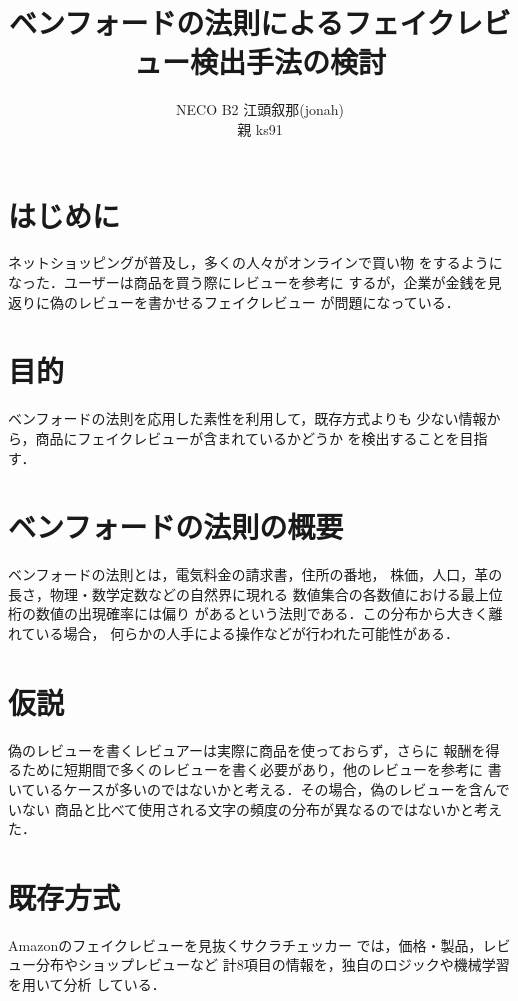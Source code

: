 \documentclass[a4paper, twocolumn]{jsarticle}
\begin{document}
\title{ベンフォードの法則によるフェイクレビュー検出手法の検討}
\author{
  NECO B2 江頭叙那(jonah)
  \\ 親 ks91 
}
\maketitle

\section{はじめに}

ネットショッピングが普及し，多くの人々がオンラインで買い物
をするようになった．ユーザーは商品を買う際にレビューを参考に
するが，企業が金銭を見返りに偽のレビューを書かせるフェイクレビュー
が問題になっている．

\section{目的}
ベンフォードの法則を応用した素性を利用して，既存方式よりも
少ない情報から，商品にフェイクレビューが含まれているかどうか
を検出することを目指す．

\section{ベンフォードの法則の概要}
ベンフォードの法則とは，電気料金の請求書，住所の番地，
株価，人口，革の長さ，物理・数学定数などの自然界に現れる
数値集合の各数値における最上位桁の数値の出現確率には偏り
があるという法則である．この分布から大きく離れている場合，
何らかの人手による操作などが行われた可能性がある．

\section{仮説}
偽のレビューを書くレビュアーは実際に商品を使っておらず，さらに
報酬を得るために短期間で多くのレビューを書く必要があり，他のレビューを参考に
書いているケースが多いのではないかと考える．その場合，偽のレビューを含んでいない
商品と比べて使用される文字の頻度の分布が異なるのではないかと考えた．


\section{既存方式}
Amazonのフェイクレビューを見抜くサクラチェッカー
では，価格・製品，レビュー分布やショップレビューなど
計8項目の情報を，独自のロジックや機械学習を用いて分析
している．
\end{document}
